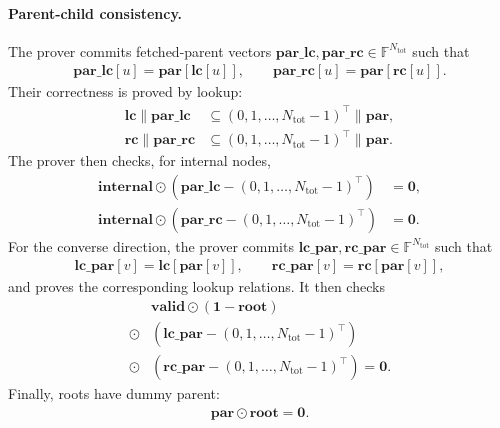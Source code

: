 \paragraph{Parent-child consistency.}
The prover commits fetched-parent vectors
$\mathbf{par\_lc},\mathbf{par\_rc}\in\mathbb{F}^{N_{\mathrm{tot}}}$ such that
\begin{align}
    \mathbf{par\_lc}[u]=\mathbf{par}[\mathbf{lc}[u]],\qquad
    \mathbf{par\_rc}[u]=\mathbf{par}[\mathbf{rc}[u]].
\end{align}
Their correctness is proved by lookup:
\begin{align}
    \mathbf{lc}\|\mathbf{par\_lc}
    &\subseteq
    (0,1,\dots,N_{\mathrm{tot}}-1)^\top\|\mathbf{par},\\
    \mathbf{rc}\|\mathbf{par\_rc}
    &\subseteq
    (0,1,\dots,N_{\mathrm{tot}}-1)^\top\|\mathbf{par}.
\end{align}
The prover then checks, for internal nodes,
\begin{align}
    \mathbf{internal}\odot
    (\mathbf{par\_lc}-(0,1,\dots,N_{\mathrm{tot}}-1)^\top)
    &=\mathbf{0},\\
    \mathbf{internal}\odot
    (\mathbf{par\_rc}-(0,1,\dots,N_{\mathrm{tot}}-1)^\top)
    &=\mathbf{0}.
\end{align}
For the converse direction, the prover commits
$\mathbf{lc\_par},\mathbf{rc\_par}\in\mathbb{F}^{N_{\mathrm{tot}}}$ such that
\begin{align}
    \mathbf{lc\_par}[v]=\mathbf{lc}[\mathbf{par}[v]],\qquad
    \mathbf{rc\_par}[v]=\mathbf{rc}[\mathbf{par}[v]],
\end{align}
and proves the corresponding lookup relations. It then checks
\begin{align}
    &\mathbf{valid}\odot(\mathbf{1}-\mathbf{root})\nonumber\\\odot
    &(\mathbf{lc\_par}-(0,1,\dots,N_{\mathrm{tot}}-1)^\top)
    \nonumber\\\odot
    &(\mathbf{rc\_par}-(0,1,\dots,N_{\mathrm{tot}}-1)^\top)
    =
    \mathbf{0}.
\end{align}
Finally, roots have dummy parent:
\begin{align}
    \mathbf{par}\odot\mathbf{root}=\mathbf{0}.
\end{align}

